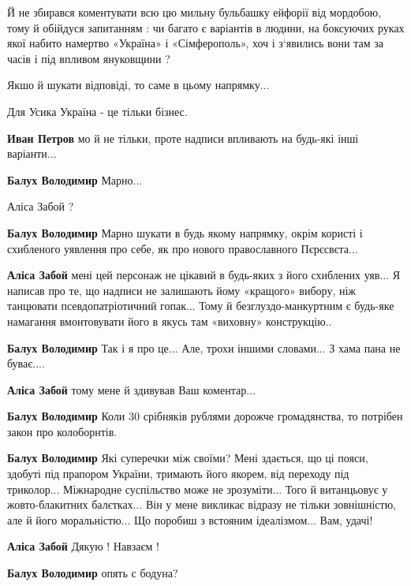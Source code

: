 \begin{itemize}

Й не збирався коментувати всю цю мильну бульбашку ейфорії від мордобою, тому й
обійдуся запитанням : чи багато є варіантів в людини, на боксуючих руках якої
набито намертво «Україна» і «Сімферополь», хоч і з‘явились вони там за часів і
під впливом януковщини ?

Якшо й шукати відповіді, то саме в цьому напрямку...

\begin{itemize} %
Для Усика Україна - це тільки бізнес.

\textbf{Иван Петров} мо й не тільки, проте надписи впливають на будь-які інші варіанти...

\textbf{Балух Володимир} Марно...

Аліса Забой ?

\textbf{Балух Володимир} Марно шукати в будь якому напрямку, окрім користі і схибленого уявлення про себе, як про нового православного Пєрєсвєта...

\textbf{Аліса Забой} мені цей персонаж не цікавий в будь-яких з його схиблених уяв...
Я написав про те, що надписи не залишають йому «кращого» вибору, ніж танцювати псевдопатріотичний гопак...
Тому й безглуздо-манкуртним є будь-яке намагання вмонтовувати його в якусь там «виховну» конструкцію..

\textbf{Балух Володимир} Так і я про це... Але, трохи іншими словами... З хама пана не буває....

\textbf{Аліса Забой} тому мене й здивував Ваш коментар...

\textbf{Балух Володимир} Коли 30 срібняків рублями дорожче громадянства, то потрібен закон про колоборнтів.

\textbf{Балух Володимир} Які суперечки між своїми? Мені здається, що ці пояси, здобуті під прапором України, тримають його якорем, від переходу під триколор... Міжнародне суспільство може не зрозуміти... Того й витанцьовує у жовто-блакитних балєтках... Він у мене викликає відразу не тільки зовнішністю, але й його моральністю... Що поробиш з встояним ідеалізмом... Вам, удачі!

\textbf{Аліса Забой} Дякую ! Навзаєм !

\textbf{Балух Володимир} опять с бодуна?


\end{itemize}
\end{itemize}
